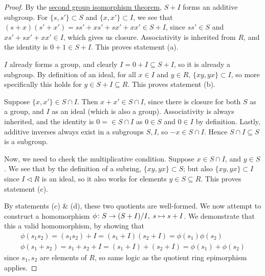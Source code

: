 \begin{proof}
    By the \hyperref[thm:iso-2-group]{second group isomorphism theorem},
    \(S+I\) forms an additive subgroup.
    For \(\{s,s'\} \subset S\) and \(\{x,x'\} \subset I\),
    we see that \((s+x)(s'+x') = ss' + xs' + sx' + xx' \in S+I\),
    since \(ss' \in S\) and \(xs' + sx' + xx' \in I\),
    which gives us closure.
    Associativity is inherited from \(R\),
    and the identity is \(0+1 \in S+I\).
    This proves statement (a).

    \medskip

    \(I\) already forms a group,
    and clearly \(I = 0+I \subseteq S+I\),
    so it is already a subgroup.
    By definition of an ideal,
    for all \(x \in I\) and \(y \in R\), \(\{xy,yx\} \subset I\),
    so more specifically this holds for \(y \in S+I \subseteq R\).
    This proves statement (b).

    \medskip

    Suppose \(\{x,x'\} \in S \cap I\).
    Then \(x+x' \in S \cap I\),
    since there is closure for both \(S\) as a group,
    and \(I\) as an ideal (which is also a group).
    Associativity is always inherited,
    and the identity is \(0 = \in S \cap I\)
    as \(0 \in S\) and \(0 \in I\) by definition.
    Lastly, additive inverses always exist in a subgroups \(S,I\),
    so \(-x \in S \cap I\).
    Hence \(S \cap I \subseteq S\) is a subgroup.

    Now, we need to check the multiplicative condition.
    Suppose \(x \in S \cap I\), and \(y \in S\).
    We see that by the definition of a subring, \(\{xy,yx\} \subset S\);
    but also \(\{xy,yx\} \subset I\) since \(I \lhd R\) is an ideal,
    so it also works for elements \(y \in S \subseteq R\).
    This proves statement (c).

    \medskip

    By statements (c) \& (d), these two quotients are well-formed.
    We now attempt to construct a homomorphism
    \(\phi\colon S\to(S+I)/I,\;s\mapsto s+I\).
    We demonstrate that this a valid homomorphism,
    by showing that
    \begin{gather*}
        \phi(s_1 s_2) = (s_1 s_2)+I = (s_1 + I)(s_2 + I) = \phi(s_1)\phi(s_2) \\
        \phi(s_1+s_2) = s_1+s_2+I = (s_1+I) + (s_2+I) = \phi(s_1) + \phi(s_2)
    \end{gather*}
    since \(s_1, s_2\) are elements of \(R\),
    so same logic as the quotient ring epimorphism applies.


\end{proof}
